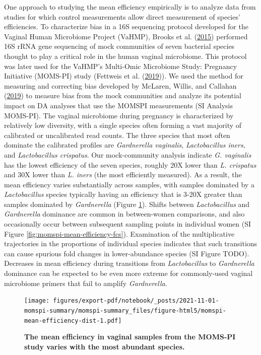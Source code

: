 \documentclass[
]{article}
\begin{document}
One approach to studying the mean efficiency empirically is to analyze data from studies for which control measurements allow direct measurement of species' efficiencies.
To characterize bias in a 16S sequencing protocol developed for the Vaginal Human Microbiome Project (VaHMP), Brooks et al. (\protect\hyperlink{ref-brooks2015thet}{2015}) performed 16S rRNA gene sequencing of mock communities of seven bacterial species thought to play a critical role in the human vaginal microbiome.
This protocol was later used for the VaHMP's Multi-Omic Microbiome Study: Pregnancy Initiative (MOMS-PI) study (Fettweis et al. (\protect\hyperlink{ref-fettweis2019thev}{2019})).
We used the method for measuring and correcting bias developed by McLaren, Willis, and Callahan (\protect\hyperlink{ref-mclaren2019cons}{2019}) to measure bias from the mock communities and analyze its potential impact on DA analyses that use the MOMSPI measurements (SI Analysis MOMS-PI).
The vaginal microbiome during pregnancy is characterized by relatively low diversity, with a single species often forming a vast majority of calibrated or uncalibrated read counts.
The three species that most often dominate the calibrated profiles are \emph{Gardnerella vaginalis}, \emph{Lactobacillus iners}, and \emph{Lactobacillus crispatus}.
Our mock-community analysis indicate \emph{G. vaginalis} has the lowest efficiency of the seven species, roughly 20X lower than \emph{L. crispatus} and 30X lower than \emph{L. iners} (the most efficiently measured).
As a result, the mean efficiency varies substantially across samples, with samples dominated by a \emph{Lactobacillus} species typically having an efficiency that is 3-20X greater than samples dominated by \emph{Gardnerella} (Figure \ref{fig:momspi-mean-efficiency-dist}).
Shifts between \emph{Lactobacillus} and \emph{Gardnerella} dominance are common in between-women comparisons, and also occasionally occur between subsequent sampling points in individual women (SI Figure \ref{fig:momspi-mean-efficiency-fcs}).
Examination of the multiplicative trajectories in the proportions of individual species indicates that such transitions can cause spurious fold changes in lower-abundance species (SI Figure TODO).
Decreases in mean efficiency during transitions from \emph{Lactobacillus} to \emph{Gardnerella} dominance can be expected to be even more extreme for commonly-used vaginal microbiome primers that fail to amplify \emph{Gardnerella}.

\begin{figure}
\centering
\texttt{[image: figures/export-pdf/notebook/\_posts/2021-11-01-momspi-summary/momspi-summary\_files/figure-html5/momspi-mean-efficiency-dist-1.pdf]}
\caption{\label{fig:momspi-mean-efficiency-dist}\textbf{The mean efficiency in vaginal samples from the MOMS-PI study varies with the most abundant species.}}
\end{figure}
\end{document}
